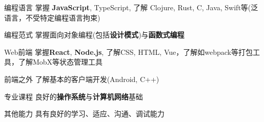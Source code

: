 

\begin{cvskills}

    \cvskill
    {编程语言} %
    {掌握 \textbf{JavaScript}, TypeScript, 了解 Clojure, Rust, C, Java, Swift等(泛语言，不受特定编程语言拘束)} %

    \cvskill
    {编程范式} %
    {掌握面向对象编程(包括\textbf{设计模式})与\textbf{函数式编程}} %

    \cvskill
    {Web前端} %
    {掌握\textbf{React}, \textbf{Node.js}, 了解CSS, HTML, Vue，了解如webpack等打包工具，了解MobX等状态管理工具} %

    \cvskill
    {前端之外} %
    {了解基本的客户端开发(Android, C++)} %

    \cvskill
    {专业课程} %
    {良好的\textbf{操作系统}与\textbf{计算机网络}基础} %

    \cvskill
    {其他能力} %
    {具有良好的学习、适应、沟通、调试能力}

\end{cvskills}
